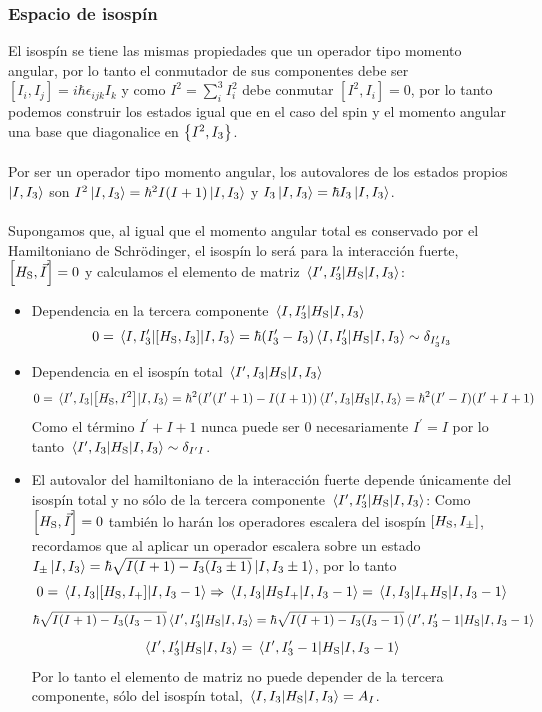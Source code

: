 \subsubsection{Espacio de isospín}
El isospín se tiene las mismas propiedades que un operador tipo momento angular, por lo tanto el conmutador de sus componentes debe ser $[I_i,I_j]=i\hbar \epsilon_{ijk}I_k$ y como $I^2=\sum^3_i I_i^2$ debe conmutar $[I^2,I_i]=0$, por lo tanto podemos construir los estados igual que en el caso del spin y el momento angular una base que diagonalice en $\qty{I^2,I_3}$.\\\\
Por ser un operador tipo momento angular, los autovalores de los estados propios $\ket{I,I_3}$ son $I^2\ket{I,I_3}=\hbar^2I(I+1)\ket{I,I_3}$ y $I_3\ket{I,I_3}=\hbar I_3\ket{I,I_3}$.\\\\
Supongamos que, al igual que el momento angular total es conservado por el Hamiltoniano de Schrödinger, el isospín lo será para la interacción fuerte, $\qty[H_\mathrm{S},\vec{I}]=0$ y calculamos el elemento de matriz $\mel{I^\prime, I_3^\prime}{H_\mathrm{S}}{I,I_3}$:
\begin{itemize}
    \item Dependencia en la tercera componente $\mel{I, I_3^\prime}{H_\mathrm{S}}{I, I_3}$ $$0=\mel{I, I_3^\prime}{\qty[H_\mathrm{S},I_3]}{I, I_3}=\hbar(I^\prime_3-I_3)\mel{I, I_3^\prime}{H_\mathrm{S}}{I, I_3}\sim \delta_{I_3^\prime I_3}$$
    
    \item Dependencia en el isospín total $\mel{I^\prime, I_3}{H_\mathrm{S}}{I, I_3}$ $$0=\mel{I^\prime, I_3}{\qty[H_\mathrm{S},I^2]}{I, I_3}=\hbar^2(I^\prime (I^\prime+1)-I(I+1))\mel{I^\prime, I_3}{H_\mathrm{S}}{I, I_3}=\hbar^2(I^\prime-I)(I^\prime+I+1)$$ Como el término $I^\prime+I+1$ nunca puede ser 0 necesariamente $I^\prime=I$ por lo tanto $\mel{I^\prime, I_3}{H_\mathrm{S}}{I, I_3}\sim \delta_{I^\prime I}$.

    \item El autovalor del hamiltoniano de la interacción fuerte depende únicamente del isospín total y no sólo de la tercera componente $\mel{I^\prime, I_3^\prime}{H_\mathrm{S}}{I, I_3}$: 
    Como $\qty[H_\mathrm{S}, \vec{I}]=0$ también lo harán los operadores escalera del isospín $\qty[H_\mathrm{S},I_\pm]$, recordamos que al aplicar un operador escalera sobre un estado $I_\pm\ket{I,I_3}=\hbar\sqrt{I(I+1)-I_3(I_3\pm 1)} \ket{I,I_3\pm1}$, por lo tanto $$0=\mel{I,I_ 3}{\qty[H_\mathrm{S},I_+]}{I, I_3-1}\Rightarrow \mel{I,I_3}{H_\mathrm{S}I_+}{I, I_3-1}=\mel{I,I_3}{I_+H_\mathrm{S}}{I, I_3-1}$$ $$\hbar\sqrt{I(I+1)-I_3(I_3- 1)}\mel{I^\prime, I_3^\prime}{H_\mathrm{S}}{I, I_3}=\hbar\sqrt{I(I+1)-I_3(I_3- 1)} \mel{I^\prime, I_3^\prime-1}{H_\mathrm{S}}{I, I_3-1}$$
    $$\mel{I^\prime, I_3^\prime}{H_\mathrm{S}}{I, I_3}=\mel{I^\prime, I_3^\prime-1}{H_\mathrm{S}}{I, I_3-1}$$
    Por lo tanto el elemento de matriz no puede depender de la tercera componente, sólo del isospín total, $\mel{I,I_3}{H_\mathrm{S}}{I,I_3}=A_I $.
\end{itemize}
